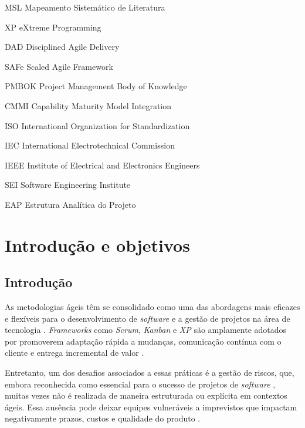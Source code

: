 \documentclass[
	12pt,
	openright,
	twoside,
	a4paper,
	english,
	brazil
	]{abntex2}
\begin{document}
\begin{siglas}
  \item[MSL] Mapeamento Sistemático de Literatura
  \item[XP] eXtreme Programming
  \item[DAD] Disciplined Agile Delivery 
  \item[SAFe] Scaled Agile Framework
  \item[PMBOK] Project Management Body of Knowledge
  \item[CMMI] Capability Maturity Model Integration
  \item[ISO] International Organization for Standardization
  \item[IEC] International Electrotechnical Commission
  \item[IEEE] Institute of Electrical and Electronics Engineers
  \item[SEI] Software Engineering Institute
  \item[EAP] Estrutura Analítica do Projeto
\end{siglas}


\tableofcontents*
\cleardoublepage
\textual


\chapter{Introdução e objetivos} %

\section{Introdução}

As metodologias ágeis têm se consolidado como uma das abordagens mais eficazes e flexíveis para o desenvolvimento de \textit{software} e a gestão de projetos na área de tecnologia \cite{AgileManifest, AgileGuide}. \textit{Frameworks} como \textit{Scrum}, \textit{Kanban} e \textit{XP} são amplamente adotados por promoverem adaptação rápida a mudanças, comunicação contínua com o cliente e entrega incremental de valor \cite{Poppendieck_Poppendieck_2003, Pressman_2014}.

Entretanto, um dos desafios associados a essas práticas é a gestão de riscos, que, embora reconhecida como essencial para o sucesso de projetos de \textit{software} \cite{PMBOK, iso16085}, muitas vezes não é realizada de maneira estruturada ou explícita em contextos ágeis. Essa ausência pode deixar equipes vulneráveis a imprevistos que impactam negativamente prazos, custos e qualidade do produto \cite{Afshari, Zahedi}.
\end{document}

